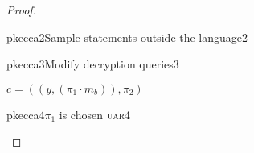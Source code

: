 \begin{proof}
\begin{cryptogame}{pkecca2}{Sample statements outside the language}{2}
        \cseqdelay
    
        \send{}{}{}
        \receive{}{}{}
    
        \cseqdelay
    
    
    \end{cryptogame}
    
    
    \begin{cryptogame}{pkecca3}{Modify decryption queries}{3}
    
        \send{}{}{}
        \receive{}{}{}
    
        \cseqdelay
    
        {$c = ((y, (\pi_1 \cdot m_b)), \pi_2)$}
        {}
    
        \cseqdelay
    
        \send{}{}{}
        \receive{}{}{}
    
        \cseqdelay
    
    
    \end{cryptogame}
    
    \begin{cryptogame}{pkecca4}{$\pi_1$ is chosen \textsc{uar}}{4}
    
        \send{}{}{}
        \receive{}{}{}
    

\end{cryptogame}
\end{proof}
